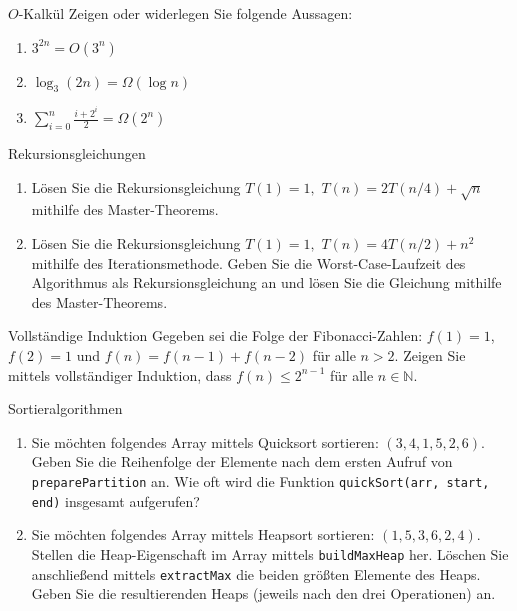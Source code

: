 \documentclass[11pt,a4paper]{article}
\begin{document}
\begin{aufgabe}{2}{$O$-Kalkül}
    Zeigen oder widerlegen Sie folgende Aussagen:
    \begin{enumerate}
        \item $3^{2n} = O(3^n)$
        \item $\log_3(2n) = \Omega(\log n)$
        \item $\sum\limits_{i=0}^n \frac{i + 2^i}{2} = \Omega(2^n)$
    \end{enumerate}
\end{aufgabe}
\begin{aufgabe}{3}{Rekursionsgleichungen}
    \begin{enumerate}
        \item Lösen Sie die Rekursionsgleichung $T(1) = 1, \,\, T(n) = 2T(n / 4) + \sqrt{n}$ mithilfe des Master-Theorems.
        \item Lösen Sie die Rekursionsgleichung $T(1) = 1, \,\, T(n) = 4T(n / 2) + n^2$ mithilfe des Iterationsmethode.
        Geben Sie die Worst-Case-Laufzeit des Algorithmus als Rekursionsgleichung an und lösen Sie die Gleichung mithilfe des Master-Theorems.
    \end{enumerate}
\end{aufgabe}
\begin{aufgabe}{4}{Vollständige Induktion}
    Gegeben sei die Folge der Fibonacci-Zahlen: $f(1) = 1$, $f(2) = 1$ und $f(n) = f(n - 1) + f(n - 2)$ für alle $n > 2$.
    Zeigen Sie mittels vollständiger Induktion, dass $f(n) \leq 2^{n - 1}$ für alle $n \in \mathbb{N}$.
\end{aufgabe}
\begin{aufgabe}{5}{Sortieralgorithmen}
    \begin{enumerate}
        \item Sie möchten folgendes Array mittels Quicksort sortieren: $(3, 4, 1, 5, 2, 6)$.
        Geben Sie die Reihenfolge der Elemente nach dem ersten Aufruf von \texttt{preparePartition} an.
        Wie oft wird die Funktion \texttt{quickSort(arr, start, end)} insgesamt aufgerufen?
        \item Sie möchten folgendes Array mittels Heapsort sortieren: $(1, 5, 3, 6, 2, 4)$.
        Stellen die Heap-Eigenschaft im Array mittels \texttt{buildMaxHeap} her.
        Löschen Sie anschließend mittels \texttt{extractMax} die beiden größten Elemente des Heaps.
        Geben Sie die resultierenden Heaps (jeweils nach den drei Operationen) an.
    \end{enumerate}
\end{aufgabe}
\end{document}
